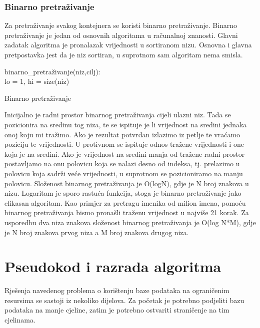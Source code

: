 \documentclass[times, utf8, zavrsni]{fer}
\begin{document}
\subsection{Binarno pretraživanje}
Za pretraživanje svakog kontejnera se koristi binarno pretraživanje. Binarno pretraživanje je jedan od osnovnih algoritama u računalnoj znanosti. Glavni zadatak algoritma je pronalazak vrijednosti u sortiranom nizu. Osnovna i glavna pretpostavka jest da je niz sortiran, u suprotnom sam algoritam nema smisla.
\newline
\newline
\begin{algorithm}[H]
	binarno\_pretraživanje(niz,cilj):\\
	lo = 1, hi = size(niz)\;
	\caption{Binarno pretraživanje}
	\label{BinarnoP}
\end{algorithm}

Inicijalno je radni prostor binarnog pretraživanja cijeli ulazni niz. Tada se pozicionira na sredinu tog niza, te se ispituje je li vrijednost na sredini jednaka onoj koju mi tražimo. Ako je rezultat potvrdan izlazimo iz petlje te vraćamo poziciju te vrijednosti. U protivnom se ispituje odnos tražene vrijednosti i one koja je na sredini. Ako je vrijednost na sredini manja od tražene radni prostor postavljamo na onu polovicu koja se nalazi desno od indeksa, tj. prelazimo u  polovicu koja sadrži veće vrijednosti, u suprotnom se pozicioniramo na manju polovicu. Složenost binarnog pretraživanja je O(logN), gdje je N broj znakova u nizu. Logaritam je sporo rastuća funkcija, stoga je binarno pretraživanje jako efikasan algoritam. Kao primjer za pretragu imenika od milion imena, pomoću binarnog pretraživanja bismo pronašli traženu vrijednost u najviše 21 korak. Za usporedbu dva niza znakova složenost binarnog pretraživanja je O(log N*M), gdje je N broj znakova prvog niza a M broj znakova drugog niza.


\chapter{Pseudokod i razrada algoritma}
Rješenja navedenog problema o korištenju baze podataka na ograničenim resursima se sastoji iz nekoliko dijelova. Za početak je potrebno podjeliti bazu podataka na manje cjeline, zatim je potrebno ostvariti straničenje na tim cjelinama.
\end{document}
